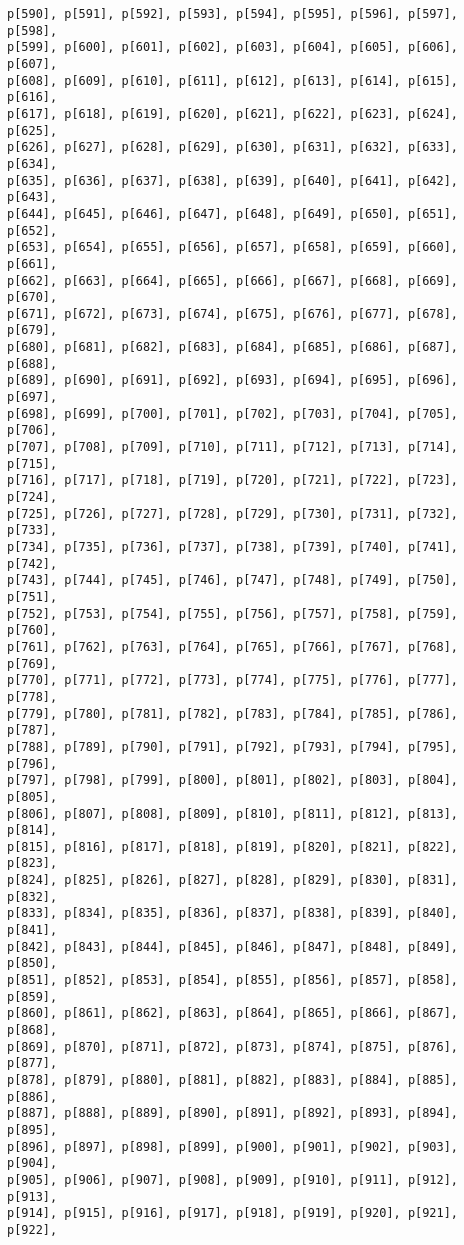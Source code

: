 \documentclass[
  letterpaper,
  DIV=11,
  numbers=noendperiod]{scrartcl}
\begin{document}
\begin{verbatim}
p[590], p[591], p[592], p[593], p[594], p[595], p[596], p[597], p[598],
p[599], p[600], p[601], p[602], p[603], p[604], p[605], p[606], p[607],
p[608], p[609], p[610], p[611], p[612], p[613], p[614], p[615], p[616],
p[617], p[618], p[619], p[620], p[621], p[622], p[623], p[624], p[625],
p[626], p[627], p[628], p[629], p[630], p[631], p[632], p[633], p[634],
p[635], p[636], p[637], p[638], p[639], p[640], p[641], p[642], p[643],
p[644], p[645], p[646], p[647], p[648], p[649], p[650], p[651], p[652],
p[653], p[654], p[655], p[656], p[657], p[658], p[659], p[660], p[661],
p[662], p[663], p[664], p[665], p[666], p[667], p[668], p[669], p[670],
p[671], p[672], p[673], p[674], p[675], p[676], p[677], p[678], p[679],
p[680], p[681], p[682], p[683], p[684], p[685], p[686], p[687], p[688],
p[689], p[690], p[691], p[692], p[693], p[694], p[695], p[696], p[697],
p[698], p[699], p[700], p[701], p[702], p[703], p[704], p[705], p[706],
p[707], p[708], p[709], p[710], p[711], p[712], p[713], p[714], p[715],
p[716], p[717], p[718], p[719], p[720], p[721], p[722], p[723], p[724],
p[725], p[726], p[727], p[728], p[729], p[730], p[731], p[732], p[733],
p[734], p[735], p[736], p[737], p[738], p[739], p[740], p[741], p[742],
p[743], p[744], p[745], p[746], p[747], p[748], p[749], p[750], p[751],
p[752], p[753], p[754], p[755], p[756], p[757], p[758], p[759], p[760],
p[761], p[762], p[763], p[764], p[765], p[766], p[767], p[768], p[769],
p[770], p[771], p[772], p[773], p[774], p[775], p[776], p[777], p[778],
p[779], p[780], p[781], p[782], p[783], p[784], p[785], p[786], p[787],
p[788], p[789], p[790], p[791], p[792], p[793], p[794], p[795], p[796],
p[797], p[798], p[799], p[800], p[801], p[802], p[803], p[804], p[805],
p[806], p[807], p[808], p[809], p[810], p[811], p[812], p[813], p[814],
p[815], p[816], p[817], p[818], p[819], p[820], p[821], p[822], p[823],
p[824], p[825], p[826], p[827], p[828], p[829], p[830], p[831], p[832],
p[833], p[834], p[835], p[836], p[837], p[838], p[839], p[840], p[841],
p[842], p[843], p[844], p[845], p[846], p[847], p[848], p[849], p[850],
p[851], p[852], p[853], p[854], p[855], p[856], p[857], p[858], p[859],
p[860], p[861], p[862], p[863], p[864], p[865], p[866], p[867], p[868],
p[869], p[870], p[871], p[872], p[873], p[874], p[875], p[876], p[877],
p[878], p[879], p[880], p[881], p[882], p[883], p[884], p[885], p[886],
p[887], p[888], p[889], p[890], p[891], p[892], p[893], p[894], p[895],
p[896], p[897], p[898], p[899], p[900], p[901], p[902], p[903], p[904],
p[905], p[906], p[907], p[908], p[909], p[910], p[911], p[912], p[913],
p[914], p[915], p[916], p[917], p[918], p[919], p[920], p[921], p[922],

\end{verbatim}
\end{document}
